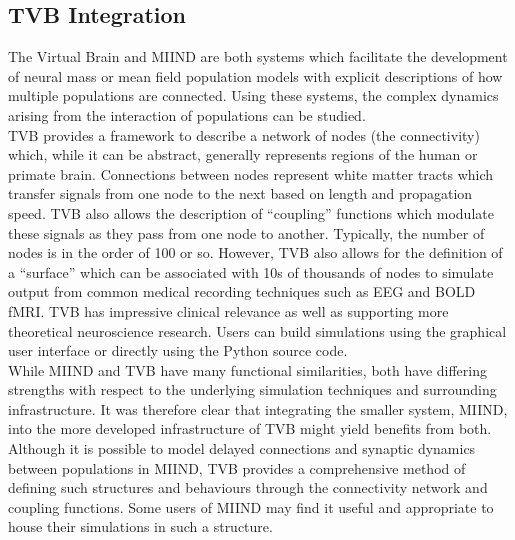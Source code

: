 \documentclass[utf8]{frontiersSCNS} %
\begin{document}
\subsection*{TVB Integration}
\label{tvbintegration}
The Virtual Brain \citep{sanz2013virtual} and MIIND are both systems which facilitate the development of neural mass or mean field population models with explicit descriptions of how multiple populations are connected. Using these systems, the complex dynamics arising from the interaction of populations can be studied.\\ 
TVB provides a framework to describe a network of nodes (the connectivity) which, while it can be abstract, generally represents regions of the human or primate brain. Connections between nodes represent white matter tracts which transfer signals from one node to the next based on length and propagation speed. TVB also allows the description of ``coupling'' functions which modulate these signals as they pass from one node to another. Typically, the number of nodes is in the order of 100 or so. However, TVB also allows for the definition of a ``surface'' which can be associated with 10s of thousands of nodes to simulate output from common medical recording techniques such as EEG and BOLD fMRI. TVB has impressive clinical relevance as well as supporting more theoretical neuroscience research. Users can build simulations using the graphical user interface or directly using the Python source code.\\ 

While MIIND and TVB have many functional similarities, both have differing strengths with respect to the underlying simulation techniques and surrounding infrastructure. It was therefore clear that integrating the smaller system, MIIND, into the more developed infrastructure of TVB might yield benefits from both.\\

Although it is possible to model delayed connections and synaptic dynamics between populations in MIIND, TVB provides a comprehensive method of defining such structures and behaviours through the connectivity network and coupling functions. Some users of MIIND may find it useful and appropriate to house their simulations in such a structure.\\
\end{document}
